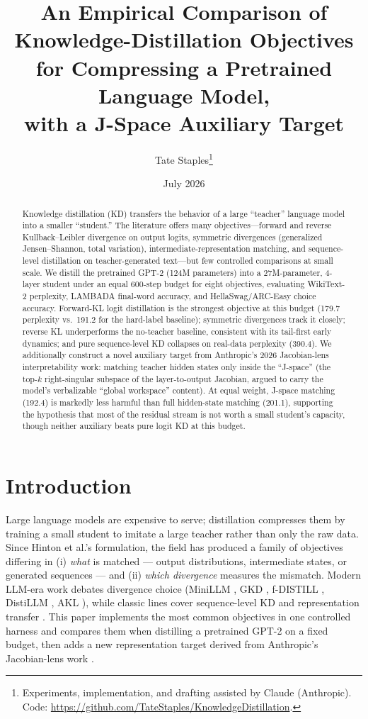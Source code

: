\documentclass[11pt]{article}
\title{An Empirical Comparison of Knowledge-Distillation Objectives for
Compressing a Pretrained Language Model,\\ with a J-Space Auxiliary Target}
\author{Tate Staples\thanks{Experiments, implementation, and drafting assisted by
Claude (Anthropic). Code: \url{https://github.com/TateStaples/KnowledgeDistillation}.}}
\date{July 2026}
\begin{document}
\maketitle

\begin{abstract}
Knowledge distillation (KD) transfers the behavior of a large ``teacher''
language model into a smaller ``student.'' The literature offers many
objectives---forward and reverse Kullback--Leibler divergence on output
logits, symmetric divergences (generalized Jensen--Shannon, total
variation), intermediate-representation matching, and sequence-level
distillation on teacher-generated text---but few controlled comparisons at
small scale. We distill the pretrained GPT-2 (124M parameters) into a
27M-parameter, 4-layer student under an equal 600-step budget for eight
objectives, evaluating WikiText-2 perplexity, LAMBADA final-word accuracy,
and HellaSwag/ARC-Easy choice accuracy. Forward-KL logit distillation is
the strongest objective at this budget (179.7 perplexity vs.\ 191.2 for
the hard-label baseline); symmetric divergences track it closely; reverse
KL underperforms the no-teacher baseline, consistent with its tail-first
early dynamics; and pure sequence-level KD collapses on real-data
perplexity (390.4). We additionally construct a novel auxiliary target
from Anthropic's 2026 Jacobian-lens interpretability work: matching
teacher hidden states only inside the ``J-space'' (the top-$k$
right-singular subspace of the layer-to-output Jacobian, argued to carry
the model's verbalizable ``global workspace'' content). At equal weight,
J-space matching (192.4) is markedly less harmful than full hidden-state
matching (201.1), supporting the hypothesis that most of the residual
stream is not worth a small student's capacity, though neither auxiliary
beats pure logit KD at this budget.
\end{abstract}

\section{Introduction}
Large language models are expensive to serve; distillation
\cite{hinton2015distilling} compresses them by training a small student to
imitate a large teacher rather than only the raw data. Since Hinton et
al.'s formulation, the field has produced a family of objectives differing
in (i) \emph{what} is matched --- output distributions, intermediate
states, or generated sequences --- and (ii) \emph{which divergence}
measures the mismatch. Modern LLM-era work debates divergence choice
(MiniLLM \cite{gu2024minillm}, GKD \cite{agarwal2024gkd}, f-DISTILL
\cite{wen2023fdivergence}, DistiLLM \cite{ko2024distillm}, AKL
\cite{wu2024rethinking}), while classic lines cover sequence-level KD
\cite{kim2016sequence} and representation transfer
\cite{sanh2019distilbert,jiao2020tinybert}. This paper implements the most
common objectives in one controlled harness and compares them when
distilling a pretrained GPT-2 on a fixed budget, then adds a new
representation target derived from Anthropic's Jacobian-lens work
\cite{anthropic2026workspace}.
\end{document}
